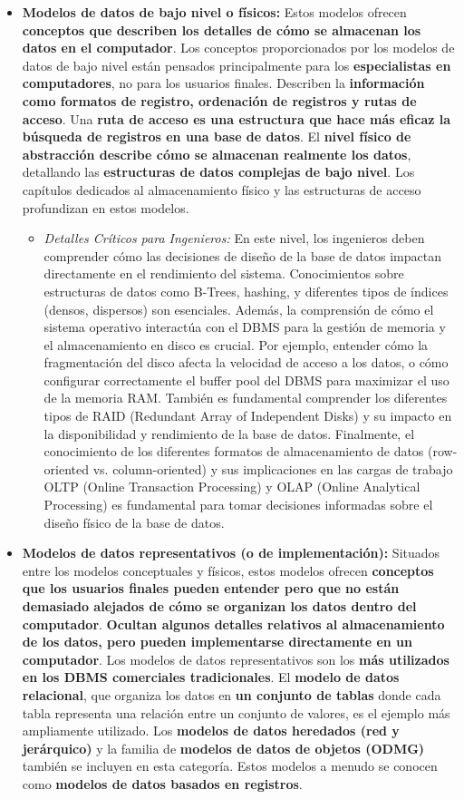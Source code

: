 \begin{itemize}
    \item \textbf{Modelos de datos de bajo nivel o físicos:} Estos modelos ofrecen \textbf{conceptos que describen los detalles de cómo se almacenan los datos en el computador}. Los conceptos proporcionados por los modelos de datos de bajo nivel están pensados principalmente para los \textbf{especialistas en computadores}, no para los usuarios finales. Describen la \textbf{información como formatos de registro, ordenación de registros y rutas de acceso}. Una \textbf{ruta de acceso es una estructura que hace más eficaz la búsqueda de registros en una base de datos}. El \textbf{nivel físico de abstracción describe cómo se almacenan realmente los datos}, detallando las \textbf{estructuras de datos complejas de bajo nivel}. Los capítulos dedicados al almacenamiento físico y las estructuras de acceso profundizan en estos modelos.

    \begin{itemize}
    \item \textit{Detalles Críticos para Ingenieros:}  En este nivel, los ingenieros deben comprender cómo las decisiones de diseño de la base de datos impactan directamente en el rendimiento del sistema.  Conocimientos sobre estructuras de datos como B-Trees, hashing, y diferentes tipos de índices (densos, dispersos) son esenciales.  Además, la comprensión de cómo el sistema operativo interactúa con el DBMS para la gestión de memoria y el almacenamiento en disco es crucial. Por ejemplo, entender cómo la fragmentación del disco afecta la velocidad de acceso a los datos, o cómo configurar correctamente el buffer pool del DBMS para maximizar el uso de la memoria RAM.  También es fundamental comprender los diferentes tipos de RAID (Redundant Array of Independent Disks) y su impacto en la disponibilidad y rendimiento de la base de datos.  Finalmente, el conocimiento de los diferentes formatos de almacenamiento de datos (row-oriented vs. column-oriented) y sus implicaciones en las cargas de trabajo OLTP (Online Transaction Processing) y OLAP (Online Analytical Processing) es fundamental para tomar decisiones informadas sobre el diseño físico de la base de datos.
    \end{itemize}

    \item \textbf{Modelos de datos representativos (o de implementación):} Situados entre los modelos conceptuales y físicos, estos modelos ofrecen \textbf{conceptos que los usuarios finales pueden entender pero que no están demasiado alejados de cómo se organizan los datos dentro del computador}. \textbf{Ocultan algunos detalles relativos al almacenamiento de los datos, pero pueden implementarse directamente en un computador}. Los modelos de datos representativos son los \textbf{más utilizados en los DBMS comerciales tradicionales}. El \textbf{modelo de datos relacional}, que organiza los datos en \textbf{un conjunto de tablas} donde cada tabla representa una relación entre un conjunto de valores, es el ejemplo más ampliamente utilizado. Los \textbf{modelos de datos heredados (red y jerárquico)} y la familia de \textbf{modelos de datos de objetos (ODMG)} también se incluyen en esta categoría. Estos modelos a menudo se conocen como \textbf{modelos de datos basados en registros}.


\end{itemize}
